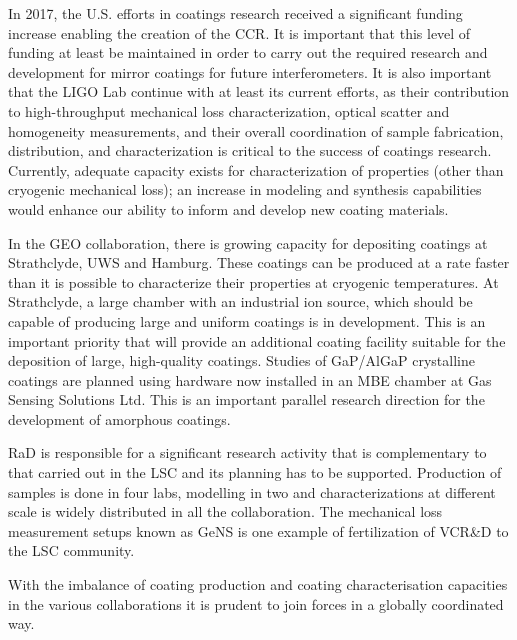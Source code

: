 In 2017, the U.S. efforts in coatings research received a significant funding increase enabling the creation of the \ac{CCR}.  It is important that this level of funding at least be maintained in order to carry out the required research and development for mirror coatings for future interferometers. It is also important that the \ac{LIGO Lab} continue with at least its current efforts, as their contribution to high-throughput mechanical loss characterization, optical scatter and homogeneity measurements, and their overall coordination of sample fabrication, distribution, and characterization is critical to the success of coatings research. Currently, adequate capacity exists for characterization of properties (other than cryogenic mechanical loss); an increase in modeling and synthesis capabilities would enhance our ability to inform and develop new coating materials.

In the \ac{GEO} collaboration, there is growing capacity for depositing coatings at Strathclyde, UWS and Hamburg. These coatings can be produced at a rate faster than it is possible to characterize their properties at cryogenic temperatures. At Strathclyde, a large chamber with an industrial ion source, which should be capable of producing large and uniform coatings is in development. This is an important priority that will provide an additional coating facility suitable for the deposition of large, high-quality coatings. Studies of \ac{GaP/AlGaP} crystalline coatings are planned using hardware now installed in an MBE chamber at Gas Sensing Solutions Ltd. This is an important parallel research direction for the development of amorphous coatings.

\ac{RaD}   is responsible for a significant research activity that is complementary to that carried out in the LSC and its planning has to be supported. Production of samples is done in four labs, modelling in two and characterizations at different scale is widely distributed in all the collaboration. The mechanical loss measurement setups known as GeNS is one example of fertilization of VCR\&D to the LSC community. 

With the imbalance of coating production and coating characterisation capacities in the various collaborations it is prudent to join forces in a globally coordinated way. 

